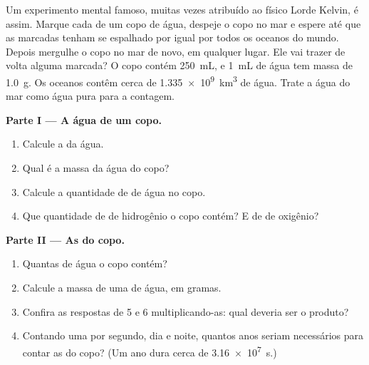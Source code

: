 \begin{problem}
\label{pb:g10:the-mole:1}
Um experimento mental famoso, muitas vezes atribuído ao físico Lorde
Kelvin, é assim. Marque cada  de um copo de água, despeje o copo
no mar e espere até que as  marcadas tenham se espalhado por
igual por todos os oceanos do mundo. Depois mergulhe o copo no mar de
novo, em qualquer lugar. Ele vai trazer de volta alguma 
marcada? O copo contém \qty{250}{mL}, e \qty{1}{mL} de água tem massa de
\qty{1.0}{g}. Os oceanos contêm cerca de \qty{1.335e9}{km^3} de água.
Trate a água do mar como água pura para a contagem.

\medskip
\noindent\textbf{Parte I --- A água de um copo.}
\begin{enumerate}
  \item Calcule a  da água.
  \item Qual é a massa da água do copo?
  \item Calcule a quantidade de  de água no copo.
  \item Que quantidade de  de hidrogênio o copo contém? E de 
        de oxigênio?
\end{enumerate}

\medskip
\noindent\textbf{Parte II --- As  do copo.}
\begin{enumerate}[resume]
  \item Quantas  de água o copo contém?
  \item Calcule a massa de uma  de água, em gramas.
  \item Confira as respostas de 5 e 6 multiplicando-as: qual deveria ser
        o produto?
  \item Contando uma  por segundo, dia e noite, quantos anos
        seriam necessários para contar as  do copo? (Um ano dura
        cerca de \qty{3.16e7}{s}.)
\end{enumerate}


\end{problem}
